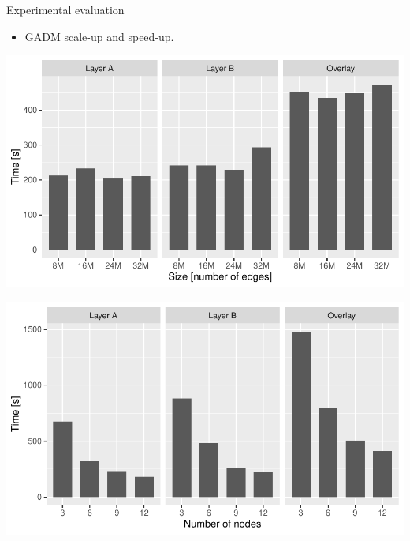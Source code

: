 \documentclass{beamer}
\begin{document}
    \begin{frame}{Experimental evaluation}
        \begin{itemize}
            \item GADM scale-up and speed-up.
        \end{itemize}
        \vspace{1cm}

        \begin{minipage}{0.49\textwidth}
            \centering
            \includegraphics[width=\textwidth]{figures/GADM_scaleup}
        \end{minipage}\hfill %
        \begin{minipage}{0.49\textwidth}
            \centering
            \includegraphics[width=\textwidth]{figures/GADM_speedup}
        \end{minipage}
    \end{frame}
    
\end{document}
